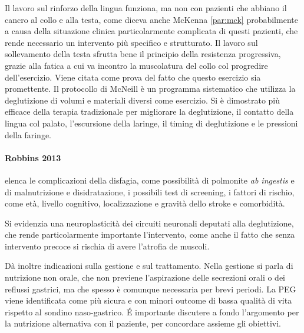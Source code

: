 Il lavoro sul rinforzo della lingua funziona, ma non con pazienti che abbiano 
il cancro al collo e alla testa, come diceva anche McKenna \ref{par:mck} 
probabilmente a causa della situazione clinica particolarmente complicata di 
questi pazienti, che rende necessario un intervento più specifico e strutturato.
Il lavoro sul sollevamento della testa sfrutta bene il principio della 
resistenza progressiva, grazie alla fatica a cui va incontro la muscolatura del 
collo col progredire dell'esercizio.
Viene citata \cite{Antunes2012} come prova del fatto che questo esercizio sia 
promettente.
Il protocollo di McNeill è un programma sistematico che utilizza la 
deglutizione di volumi e materiali diversi come esercizio.
Si è dimostrato più efficace della terapia tradizionale per migliorare la 
deglutizione, il contatto della lingua col palato, l'escursione della laringe, 
il timing di deglutizione e le pressioni della faringe.

\paragraph{Robbins 2013}\label{par:rob2013}\cite{Robbins2013} elenca le 
complicazioni 
della disfagia, come possibilità di polmonite \textit{ab ingestis} e di 
malnutrizione e disidratazione, i possibili test di screening, i fattori di 
rischio, come età, livello cognitivo, localizzazione e gravità dello stroke e 
comorbidità.

Si evidenzia una neuroplasticità dei circuiti neuronali deputati alla 
deglutizione, che rende particolarmente importante l'intervento, come anche il 
fatto che senza intervento precoce si rischia di avere l'atrofia de muscoli.

Dà inoltre indicazioni sulla gestione e sul trattamento.
Nella gestione si parla di nutrizione non orale, che non previene l'aspirazione 
delle secrezioni orali o dei reflussi gastrici, ma che spesso è comunque 
necessaria per brevi periodi.
La PEG viene identificata come più sicura e con minori outcome di bassa qualità 
di vita rispetto al sondino naso-gastrico.
\'E importante discutere a fondo l'argomento per la nutrizione alternativa con 
il paziente, per concordare assieme gli obiettivi.

